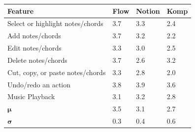 			\begin{table}[H]
			  \centering
			   \label{tab:compare-i3}
			  \begin{tabular}{|p{6cm}|R{1.5cm}|R{1.5cm}|R{1.5cm}|}
			  	\hline 
			  	\textbf{Feature} & \textbf{Flow} & \textbf{Notion} & \textbf{Komp} \\ \hline

				Select or highlight notes/chords 		& 3.7 & 3.3 & 2.4 \\ \hline
				Add notes/chords 							& 3.7 & 3.2 & 2.2 \\ \hline
				Edit notes/chords 							& 3.3 & 3.0 & 2.5 \\ \hline
				Delete notes/chords 						& 3.7 & 2.6 & 3.2 \\ \hline
				Cut, copy, or paste notes/chords 	& 3.3 & 2.8 & 2.0 \\ \hline
				Undo/redo an action 						& 3.8 & 3.9 & 3.6 \\ \hline
				Music Playback 								& 3.1 & 3.2 & 2.8 \\ \hline

				\begin{math}\bm{\mu}\end{math} 		& 3.5 & 3.1 & 2.7 \\ \hline
				\begin{math}\bm{\sigma}\end{math} 	& 0.3 & 0.4 & 0.6 \\ \hline
			  \end{tabular}
			\end{table}

